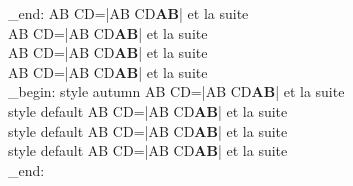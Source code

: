\group_end:
\ExplSyntaxOff
{}
AB CD=\CDRCode|AB CD\textbf{AB}| et la suite\\
AB CD=\CDRCode[style=autumn]|AB CD\textbf{AB}| et la suite\\
AB CD=\CDRCode[cache=true]|AB CD\textbf{AB}| et la suite\\
AB CD=\CDRCode[cache=true,debug=true]|AB CD\textbf{AB}| et la suite\\
\ExplSyntaxOn
\group_begin:
\ExplSyntaxOff
{}
style autumn  AB CD=\CDRCode[tag=X]|AB CD\textbf{AB}| et la suite\\
style default AB CD=\CDRCode[tag=Y]|AB CD\textbf{AB}| et la suite\\
style default AB CD=\CDRCode[engine=efbox, efbox engine options={hidealllines,backgroundcolor=red}, engine options={backgroundcolor=yellow}]|AB CD\textbf{AB}| et la suite\\
style default AB CD=\CDRCode[format=\color{blue}]|AB CD\textbf{AB}| et la suite\\
\ExplSyntaxOn
\group_end:
\ExplSyntaxOff
{}
